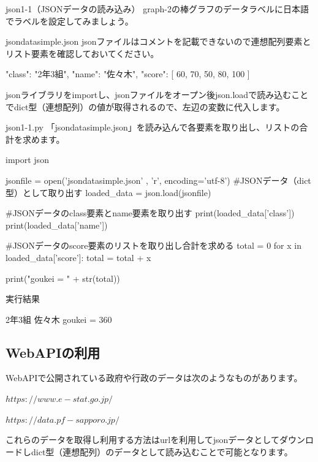 \begin{pabox}{json1-1（JSONデータの読み込み）}
graph-2の棒グラフのデータラベルに日本語でラベルを設定してみましょう。
\begin{legbox}{jsondatasimple.json}
jsonファイルはコメントを記載できないので連想配列要素とリスト要素を確認しておいてください。
\begin{listing}{1}
{
    "class": "2年3組",
    "name": "佐々木",
    "score": [
        60,
        70,
        50,
        80,
        100
    ]
}
\end{listing}
\end{legbox}
jsonライブラリをimportし、jsonファイルをオープン後json.loadで読み込むことでdict型（連想配列）の値が取得されるので、左辺の変数に代入します。
\begin{legbox}{json1-1.py}
「jsondatasimple.json」を読み込んで各要素を取り出し、リストの合計を求めます。
\begin{listing}{1}
import json

jsonfile = open('jsondatasimple.json' , 'r', encoding='utf-8') 
#JSONデータ（dict型）として取り出す
loaded_data = json.load(jsonfile)  

#JSONデータのclass要素とname要素を取り出す
print(loaded_data['class'])
print(loaded_data['name'])

#JSONデータのscore要素のリストを取り出し合計を求める
total = 0
for x in loaded_data['score']:
    total = total + x

print("goukei = " + str(total))
\end{listing}
実行結果
\begin{listing}{1}
2年3組
佐々木
goukei = 360
\end{listing}

\end{legbox}
\end{pabox}

\subsection{WebAPIの利用}


WebAPIで公開されている政府や行政のデータは次のようなものがあります。

\begin{description}
	\item $https://www.e-stat.go.jp/$
	\item $https://data.pf-sapporo.jp/$
\end{description}

これらのデータを取得し利用する方法はurlを利用してjsonデータとしてダウンロードしdict型（連想配列）のデータとして読み込むことで可能となります。

